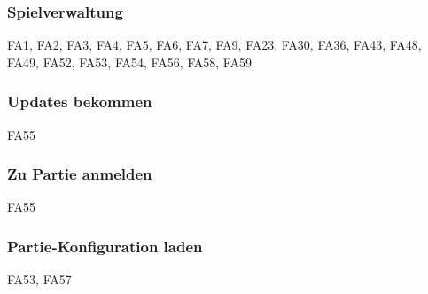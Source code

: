 \subsubsection{Spielverwaltung}
FA1,
FA2, 
FA3, 
FA4, 
FA5, 
FA6, 
FA7, 
FA9, 
FA23, 
FA30, 
FA36, 
FA43, 
FA48, 
FA49, 
FA52, 
FA53, 
FA54, 
FA56, 
FA58, 
FA59 

\subsubsection{Updates bekommen}
FA55

\subsubsection{Zu Partie anmelden}
FA55

\subsubsection{Partie-Konfiguration laden}
FA53,
FA57

